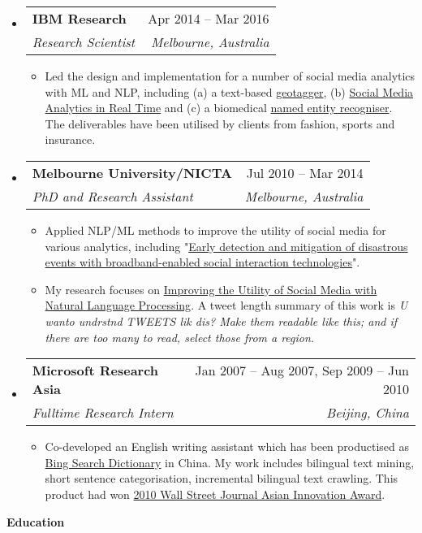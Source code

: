 \documentclass[letterpaper,12pt]{article}[leftmargin=*]
\makeatletter
\def \entryspacing {-0pt}
\renewcommand{\section}[2]{\vspace{5pt}
  \colorbox{secondary}{\color{white}\raggedbottom\normalsize\textbf{{#1}{\hspace{7pt}#2}}}
}
\newcommand{\resumeEntryStart}{\begin{itemize}[leftmargin=2.5mm]}
\newcommand{\resumeEntryEnd}{\end{itemize}\vspace{\entryspacing}}
\newcommand{\resumeItemListStart}{\begin{itemize}[leftmargin=4.5mm]}
\newcommand{\resumeItemListEnd}{\end{itemize}}
\newcommand{\resumeItem}[1]{
  \item\small{
    {#1 \vspace{-2pt}}
  }
}
\newcommand{\resumeEntryTSDL}[4]{
  \vspace{-1pt}\item[]
    \begin{tabularx}{0.97\textwidth}{X@{\hspace{60pt}}r}
      \textbf{\color{primary}#1} & {\firabook\color{accent}\small#2} \\
      \textit{\color{accent}\small#3} & \textit{\color{accent}\small#4} \\
    \end{tabularx}\vspace{-6pt}
}
\makeatother
\begin{document}
  \resumeEntryStart
    \resumeEntryTSDL
      {IBM Research}{Apr 2014 -- Mar 2016}
      {Research Scientist}{Melbourne, Australia}
    \resumeItemListStart
      \resumeItem {Led the design and implementation for a number of social media analytics with ML and NLP, including (a) a text-based \href{http://researcher.watson.ibm.com/researcher/view_group.php?id=6349}{geotagger}, (b) \href{http://researcher.watson.ibm.com/researcher/view_group.php?id=6350}{Social Media Analytics in Real Time} and (c) a biomedical \href{http://researcher.watson.ibm.com/researcher/view_group_pubs.php?grp=5727}{named entity recogniser}. The deliverables have been utilised by clients from fashion, sports and insurance.}
    \resumeItemListEnd
  \resumeEntryEnd

  \resumeEntryStart
    \resumeEntryTSDL
      {Melbourne University/NICTA}{Jul 2010 -- Mar 2014}
      {PhD and Research Assistant}{Melbourne, Australia}
    \resumeItemListStart
      \resumeItem {Applied NLP/ML methods to improve the utility of social media for various analytics, including "\href{http://research.unimelb.edu.au/__data/assets/pdf_file/0006/1891914/IBES-2012-Annual-Report.pdf}{Early detection and mitigation of disastrous events with broadband-enabled social interaction technologies}".}
      \resumeItem {My research focuses on \href{https://minerva-access.unimelb.edu.au/bitstream/handle/11343/41029/thesis.pdf?sequence=1}{Improving the Utility of Social Media with Natural Language Processing}. A tweet length summary of this work is \textit{U wanto undrstnd TWEETS lik dis? Make them readable like this; and if there are too many to read, select those from a region.}}
    \resumeItemListEnd
  \resumeEntryEnd

  \resumeEntryStart
    \resumeEntryTSDL
      {Microsoft Research Asia}{Jan 2007 -- Aug 2007, Sep 2009 -- Jun 2010}
      {Fulltime Research Intern}{Beijing, China}
    \resumeItemListStart
      \resumeItem {Co-developed an English writing assistant which has been productised as \href{https://www.bing.com/dict?FORM=Z9LH3}{Bing Search Dictionary} in China. My work includes bilingual text mining, short sentence categorisation, incremental bilingual text crawling. This product had won \href{https://www.wsj.com/articles/SB10001424052748703545604575406771145298614}{2010 Wall Street Journal Asian Innovation Award}.}
    \resumeItemListEnd
  \resumeEntryEnd

\section{\faGraduationCap}{Education}
\end{document}
